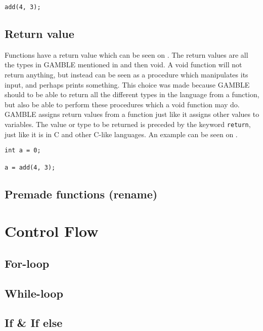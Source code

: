 \begin{lstlisting}[label=functionCall]
add(4, 3);
\end{lstlisting}


\subsection{Return value}
Functions have a return value which can be seen on .
The return values are all the types in GAMBLE mentioned in  and then void. 
A void function will not return anything, but instead can be seen as a procedure which manipulates its input, and perhaps prints something.
This choice was made because GAMBLE should to be able to return all the different types in the language from a function, but also be able to perform these procedures which a void function may do.
GAMBLE assigns return values from a function just like it assigns other values to variables.
The value or type to be returned is preceded by the keyword \texttt{return}, just like it is in C and other C-like languages.
An example can be seen on .

\begin{lstlisting}[label=returnFunction]
int a = 0;

a = add(4, 3);
\end{lstlisting}

\subsection{Premade functions (rename)}


\section{Control Flow}
\subsection{For-loop}

\subsection{While-loop}

\subsection{If \& If else}
